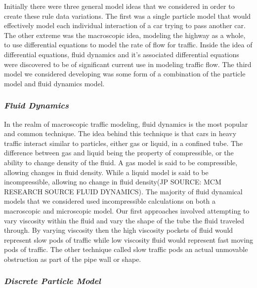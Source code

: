 \documentclass{amsart}
\begin{document}
	
	
	Initially there were three general model ideas that we considered in order to create these rule data variations. The first was a single particle model that would effectively model each individual interaction of a car trying to pass another car.  The other extreme was the macroscopic idea, modeling the highway as a whole, to use differential equations to model the rate of flow for traffic.  Inside the idea of differential equations, fluid dynamics and it's associated differential equations were discovered to be of significant current use in modeling traffic flow.  The third model we considered developing was some form of a combination of the particle model and fluid dynamics model. 
		
		\subsubsection{\it Fluid Dynamics}
		In the realm of macroscopic traffic modeling, fluid dynamics is the most popular and common technique.  The idea behind this technique is that cars in heavy traffic interact similar to particles, either gas or liquid, in a confined tube.  
The difference between gas and liquid being the property of compressible, or the ability to change density of the fluid.  A gas model is said to be compressible, allowing changes in  fluid density.  While a liquid model is said to be incompressible, allowing no change in fluid density(JP SOURCE: MCM RESEARCH SOURCE FLUID DYNAMICS).  The majority of fluid dynamical models that we considered used incompressible calculations on both a macroscopic and microscopic model.  Our first approaches involved attempting to vary viscosity within the fluid and vary the shape of the tube the fluid traveled through.  By varying viscosity then the high viscosity pockets of fluid would represent slow pods of traffic while low viscosity fluid would represent fast moving pods of traffic.  The other technique called slow traffic pods an actual unmovable obstruction as part of the pipe wall or shape.  
		
		
	
	
	
		
		\subsubsection{\it Discrete Particle Model}
		
\end{document}
